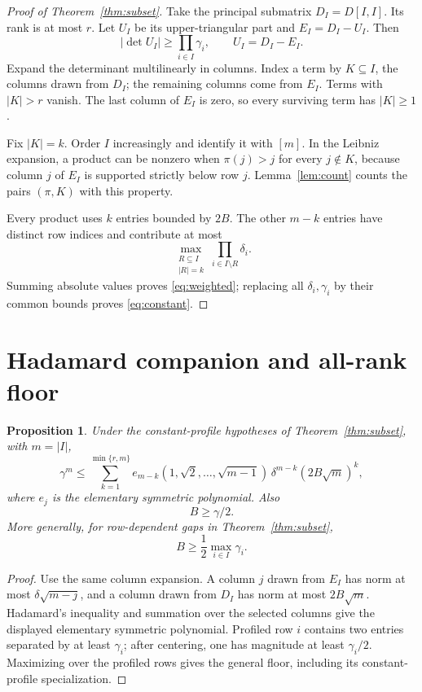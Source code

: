 \documentclass[10pt]{article}
\newtheorem{proposition}[theorem]{Proposition}
\theoremstyle{definition}
\begin{document}
\begin{proof}[Proof of Theorem~\ref{thm:subset}]
Take the principal submatrix \(D_I=D[I,I]\).  Its rank is at most \(r\).
Let \(U_I\) be its upper-triangular part and \(E_I=D_I-U_I\).  Then
\[
 |\det U_I|\ge\prod_{i\in I}\gamma_i,\qquad U_I=D_I-E_I.
\]
Expand the determinant multilinearly in columns.  Index a term by
\(K\subseteq I\), the columns drawn from \(D_I\); the remaining columns come
from \(E_I\).  Terms with \(|K|>r\) vanish.  The last column of \(E_I\) is
zero, so every surviving term has \(|K|\ge1\).

Fix \(|K|=k\).  Order \(I\) increasingly and identify it with \([m]\).
In the Leibniz expansion, a product can be nonzero when
\(\pi(j)>j\) for every \(j\notin K\), because column \(j\) of \(E_I\) is
supported strictly below row \(j\).  Lemma~\ref{lem:count} counts the pairs
\((\pi,K)\) with this property.

Every product uses \(k\) entries bounded by \(2B\).  The other \(m-k\)
entries have distinct row indices and contribute at most
\[
 \max_{\substack{R\subseteq I\\|R|=k}}
 \prod_{i\in I\setminus R}\delta_i .
\]
Summing absolute values proves \eqref{eq:weighted}; replacing all
\(\delta_i,\gamma_i\) by their common bounds proves
\eqref{eq:constant}.
\end{proof}

\section{Hadamard companion and all-rank floor}
\label{app:hadamard}

\begin{proposition}\label{prop:hadamard}
Under the constant-profile hypotheses of
Theorem~\ref{thm:subset}, with \(m=|I|\),
\[
 \gamma^m\le
 \sum_{k=1}^{\min\{r,m\}}
 e_{m-k}(1,\sqrt2,\ldots,\sqrt{m-1})\,
 \delta^{m-k}(2B\sqrt m)^k ,
\]
where \(e_j\) is the elementary symmetric polynomial.  Also
\[
 B\ge\gamma/2.
\]
More generally, for row-dependent gaps in Theorem~\ref{thm:subset},
\[
 B\ge\frac12\max_{i\in I}\gamma_i.
\]
\end{proposition}

\begin{proof}
Use the same column expansion.  A column \(j\) drawn from \(E_I\) has norm at
most \(\delta\sqrt{m-j}\), and a column drawn from \(D_I\) has norm at most
\(2B\sqrt m\).  Hadamard's inequality and summation over the selected columns
give the displayed elementary symmetric polynomial.  Profiled row \(i\)
contains two entries separated by at least \(\gamma_i\); after centering, one
has magnitude at least \(\gamma_i/2\).  Maximizing over the profiled rows gives
the general floor, including its constant-profile specialization.
\end{proof}
\end{document}
